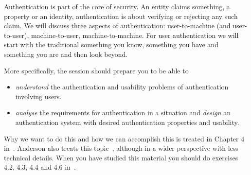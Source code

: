 Authentication is part of the core of security.
An entity claims something, a property or an identity, authentication is about 
verifying or rejecting any such claim.
We will discuss three aspects of authentication:
user-to-machine (and user-to-user),
machine-to-user,
machine-to-machine.
For user authentication we will start with the traditional something you know, 
something you have and something you are and then look beyond.

More specifically, the session should prepare you to be able to
\begin{itemize}
  \item \emph{understand} the authentication and usability problems of 
    authentication involving users.
  \item \emph{analyse} the requirements for authentication in a situation and 
    \emph{design} an authentication system with desired authentication 
    properties and usability.
\end{itemize}

Why we want to do this and how we can accomplish this is treated in Chapter 
4 in~\cite{Gollmann2011cs}.
Anderson also treats this topic~\cite[Chap.~2]{Anderson2008sea}, although in 
a wider perspective with less technical details.
When you have studied this material you should do exercises 4.2, 4.3, 4.4 and 
4.6 in~\cite{Gollmann2011cs}.
